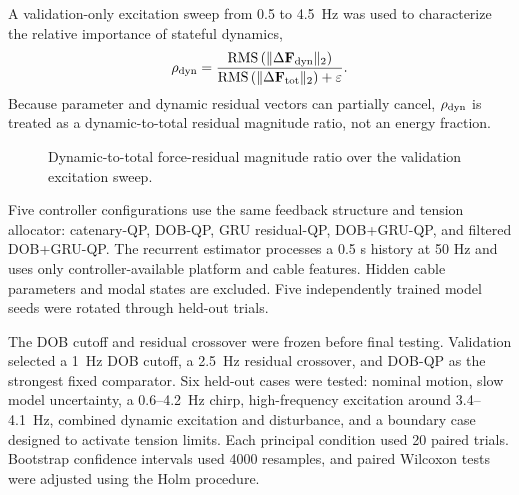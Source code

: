 \documentclass[conference]{IEEEtran}
\begin{document}
A validation-only excitation sweep from 0.5 to \SI{4.5}{Hz} was used to characterize the relative importance of stateful dynamics,
\begin{equation}
\rho_{\rm dyn}=
\frac{\mathrm{RMS}\left(\|\Delta\mathbf F_{\rm dyn}\|_2\right)}
{\mathrm{RMS}\left(\|\Delta\mathbf F_{\rm tot}\|_2\right)+\varepsilon}.
\end{equation}
Because parameter and dynamic residual vectors can partially cancel, $\rho_{\rm dyn}$ is treated as a dynamic-to-total residual magnitude ratio, not an energy fraction.

\begin{figure}[t]
\centering
{}
\caption{Dynamic-to-total force-residual magnitude ratio over the validation excitation sweep.}
\label{fig:residualmap}
\end{figure}

Five controller configurations use the same feedback structure and tension allocator: catenary-QP, DOB-QP, GRU residual-QP, DOB+GRU-QP, and filtered DOB+GRU-QP. The recurrent estimator processes a 0.5 s history at 50 Hz and uses only controller-available platform and cable features. Hidden cable parameters and modal states are excluded. Five independently trained model seeds were rotated through held-out trials.

The DOB cutoff and residual crossover were frozen before final testing. Validation selected a \SI{1}{Hz} DOB cutoff, a \SI{2.5}{Hz} residual crossover, and DOB-QP as the strongest fixed comparator. Six held-out cases were tested: nominal motion, slow model uncertainty, a 0.6--\SI{4.2}{Hz} chirp, high-frequency excitation around 3.4--\SI{4.1}{Hz}, combined dynamic excitation and disturbance, and a boundary case designed to activate tension limits. Each principal condition used 20 paired trials. Bootstrap confidence intervals used 4000 resamples, and paired Wilcoxon tests were adjusted using the Holm procedure.
\end{document}
